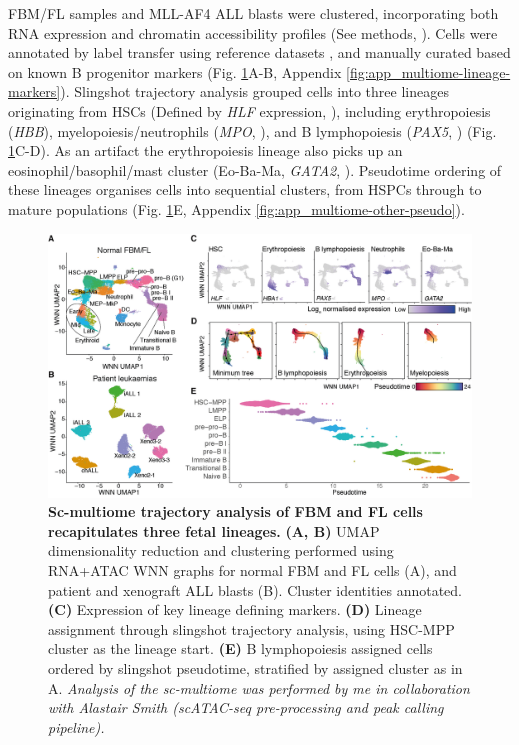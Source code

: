 FBM/FL samples and MLL-AF4 ALL blasts were clustered, incorporating both RNA expression and chromatin accessibility profiles (See methods, \cite{hao_integrated_2021}). Cells were annotated by label transfer using reference datasets \citep{popescu_decoding_2019, jardine_blood_2021, roy_transitions_2021}, and manually curated based on known B progenitor markers (Fig. \ref{fig:ch4_multiome-clusters}A-B, Appendix \ref{fig:app_multiome-lineage-markers}). Slingshot trajectory analysis grouped cells into three lineages originating from HSCs (Defined by \textit{HLF} expression, \cite{lehnertz_hlf_2021}), including erythropoiesis (\textit{HBB}), myelopoiesis/neutrophils (\textit{MPO}, \cite{aratani_myeloperoxidase_2018}), and B lymphopoiesis (\textit{PAX5}, \cite{nutt_pax5_2001}) (Fig. \ref{fig:ch4_multiome-clusters}C-D). As an artifact the erythropoiesis lineage also picks up an eosinophil/basophil/mast cluster (Eo-Ba-Ma, \textit{GATA2}, \cite{ohmori_gata2_2015}). Pseudotime ordering of these lineages organises cells into sequential clusters, from HSPCs through to mature populations (Fig. \ref{fig:ch4_multiome-clusters}E, Appendix \ref{fig:app_multiome-other-pseudo}).

\begin{figure}[htbp]
    \centering
    \includegraphics[width=\textwidth,height=\textheight,keepaspectratio]{figures/chapter4/ch4_multiome-clusters.png}
    \caption[{Sc-multiome trajectory analysis of  FBM and FL cells recapitulates three fetal lineages.}]
    {\textbf{Sc-multiome trajectory analysis of  FBM and FL cells recapitulates three fetal lineages.} 
    \textbf{(A, B)} UMAP dimensionality reduction and clustering performed using RNA+ATAC WNN graphs for normal FBM and FL cells (A), and patient and xenograft ALL blasts (B). Cluster identities annotated.
    \textbf{(C)} Expression of key lineage defining markers.
    \textbf{(D)} Lineage assignment through slingshot trajectory analysis, using HSC-MPP cluster as the lineage start.
    \textbf{(E)} B lymphopoiesis assigned cells ordered by slingshot pseudotime, stratified by assigned cluster as in A. 
    \textit{Analysis of the sc-multiome was performed by me in collaboration with Alastair Smith (scATAC-seq pre-processing and peak calling pipeline).}
    }
    \label{fig:ch4_multiome-clusters}
\end{figure}

